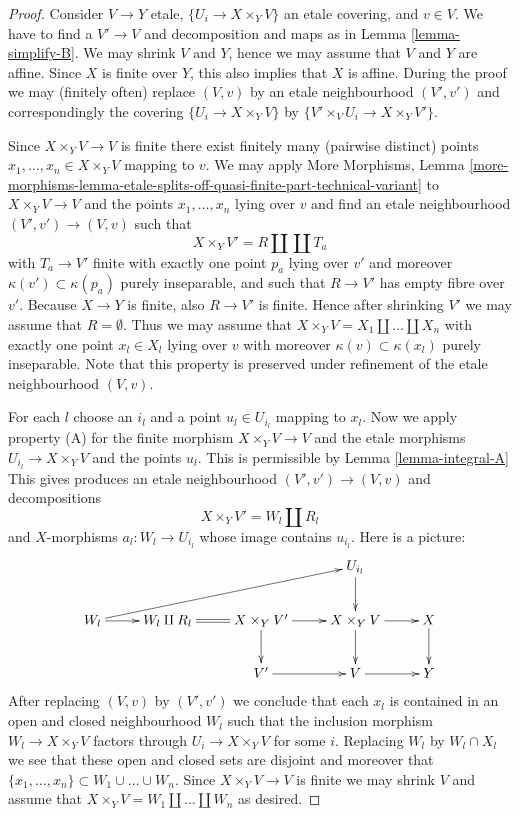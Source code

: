\begin{proof}
Consider $V \to Y$ etale, $\{U_i \to X \times_Y V\}$ an etale covering, and
$v \in V$. We have to find a $V' \to V$ and decomposition and maps as in
Lemma \ref{lemma-simplify-B}.
We may shrink $V$ and $Y$, hence we may assume that $V$ and $Y$ are affine.
Since $X$ is finite over $Y$, this also implies that $X$ is affine.
During the proof we may (finitely often) replace $(V, v)$ by an
etale neighbourhood $(V', v')$ and correspondingly the covering
$\{U_i \to X \times_Y V\}$ by $\{V' \times_V U_i \to X \times_Y V'\}$.

\medskip\noindent
Since $X \times_Y V \to V$ is finite there exist finitely
many (pairwise distinct) points $x_1, \ldots, x_n \in X \times_Y V$
mapping to $v$. We may apply
More Morphisms, Lemma
\ref{more-morphisms-lemma-etale-splits-off-quasi-finite-part-technical-variant}
to $X \times_Y V \to V$ and the points $x_1, \ldots, x_n$ lying over
$v$ and find an etale neighbourhood $(V', v') \to (V, v)$
such that
$$
X \times_Y V' = R \amalg \coprod T_a
$$
with $T_a \to V'$ finite with exactly one point $p_a$ lying over $v'$
and moreover $\kappa(v') \subset \kappa(p_a)$ purely inseparable, and
such that $R \to V'$ has empty fibre over $v'$.
Because $X \to Y$ is finite, also $R \to V'$ is finite. Hence after
shrinking $V'$ we may assume that $R = \emptyset$. Thus we may
assume that $X \times_Y V = X_1 \amalg \ldots \amalg X_n$ with
exactly one point $x_l \in X_l$ lying over $v$ with moreover
$\kappa(v) \subset \kappa(x_l)$ purely inseparable. Note that this
property is preserved under refinement of the etale neighbourhood
$(V, v)$.

\medskip\noindent
For each $l$ choose an $i_l$ and a point $u_l \in U_{i_l}$ mapping to $x_l$.
Now we apply property (A) for the finite morphism
$X \times_Y V \to V$ and the etale
morphisms $U_{i_l} \to X \times_Y V$ and the points $u_l$.
This is permissible by
Lemma \ref{lemma-integral-A}
This gives produces an etale neighbourhood $(V', v') \to (V, v)$
and decompositions
$$
X \times_Y V' = W_l \amalg R_l
$$
and $X$-morphisms $a_l : W_l \to U_{i_l}$ whose image contains $u_{i_l}$.
Here is a picture:
$$
\xymatrix{
& & & U_{i_l} \ar[d] & \\
W_l \ar[rrru] \ar[r] & W_l \amalg R_l \ar@{=}[r] &
X \times_Y V' \ar[r] \ar[d] &
X \times_Y V \ar[r] \ar[d] & X \ar[d] \\
& & V' \ar[r] & V \ar[r] & Y
}
$$
After replacing $(V, v)$ by $(V', v')$ we conclude that each
$x_l$ is contained in an open and closed neighbourhood $W_l$ such that
the inclusion morphism $W_l \to X \times_Y V$ factors through
$U_i \to X \times_Y V$ for some $i$. Replacing $W_l$ by $W_l \cap X_l$
we see that these open and closed sets are disjoint and moreover
that $\{x_1, \ldots, x_n\} \subset W_1 \cup \ldots \cup W_n$.
Since $X \times_Y V \to V$ is finite we may shrink $V$ and assume that
$X \times_Y V = W_1 \amalg \ldots \amalg W_n$ as desired.
\end{proof}

